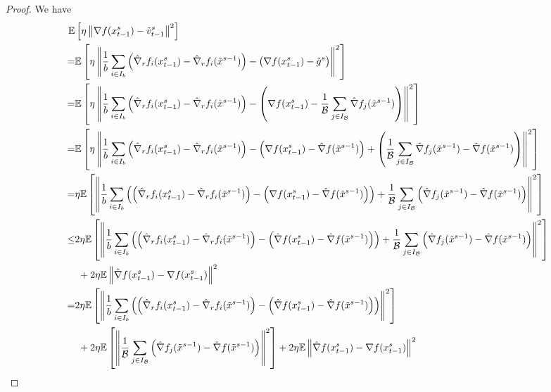 \documentclass[iicol,sn-basic]{sn-jnl}
\theoremstyle{thmstyleone}%
\theoremstyle{thmstyletwo}%
\theoremstyle{thmstylethree}%
\newcommand*{\E}{\mathbb{E}}
\newcommand{\norm}[1]{\left\lVert#1\right\rVert}
\begin{document}
\begin{proof}
We have
\begin{align}
  \E&\left[\eta\norm{\nabla f(x_{t-1}^s)-{\tilde{v}_{t-1}^s}}^2\right]\notag\\
   =&\E\left[\eta\norm{\frac{1}{b}\sum_{i\in I_b}\left(\hat{\nabla}_r f_i(x_{t-1}^s)-\hat{\nabla}_r f_i(\tilde{x}^{s-1})\right) - \left(\nabla f(x_{t-1}^s)-\hat{g}^s\right)}^2\right]\notag\\
   =&\E\left[\eta\norm{\frac{1}{b}\sum_{i\in I_b}\left(\hat{\nabla}_r f_i(x_{t-1}^s)-\hat{\nabla}_r f_i(\tilde{x}^{s-1})\right) - \left(\nabla f(x_{t-1}^s)-\frac{1}{\mathcal{B}}\sum_{j\in I_{\mathcal{B}}}\hat{\nabla} f_j(\tilde{x}^{s-1})\right)}^2\right]\notag\\
   =&\notag\E\left[\eta\norm{\frac{1}{b}\sum_{i\in I_b}\left(\hat{\nabla}_r f_i(x_{t-1}^s)-\hat{\nabla}_r f_i(\tilde{x}^{s-1})\right) - \left(\nabla f(x_{t-1}^s) - \hat{\nabla} f(\tilde{x}^{s-1}) \right)+ \left(\frac{1}{\mathcal{B}}\sum_{j\in I_{\mathcal{B}}}\hat{\nabla} f_j(\tilde{x}^{s-1}) - \hat{\nabla} f(\tilde{x}^{s-1})\right)}^2\right]\\
   =&\notag\eta\E\left[\norm{\frac{1}{b}\sum_{i\in I_b}\left(\left(\hat{\nabla}_r f_i(x_{t-1}^s)-\hat{\nabla}_r f_i(\tilde{x}^{s-1})\right) - \left(\nabla f(x_{t-1}^s) - \hat{\nabla} f(\tilde{x}^{s-1}) \right)\right)+ \frac{1}{\mathcal{B}}\sum_{j\in I_{\mathcal{B}}}\left(\hat{\nabla} f_j(\tilde{x}^{s-1}) - \hat{\nabla} f(\tilde{x}^{s-1})\right)}^2\right]\\
   \leq &\notag2\eta\E\left[\norm{\frac{1}{b}\sum_{i\in I_b}\left(\left(\hat{\nabla}_r f_i(x_{t-1}^s)-\hat{\nabla}_r f_i(\tilde{x}^{s-1})\right) - \left(\hat{\nabla} f(x_{t-1}^s) - \hat{\nabla} f(\tilde{x}^{s-1}) \right)\right)+ \frac{1}{\mathcal{B}}\sum_{j\in I_{\mathcal{B}}}\left(\hat{\nabla} f_j(\tilde{x}^{s-1}) - \hat{\nabla} f(\tilde{x}^{s-1})\right)}^2\right]\\
   &\,\, + 2\eta \E \norm{\hat{\nabla} f(x_{t-1}^s)-\nabla f(x_{t-1}^s)}^2\label{RandSGE-var-estimate-lem-1}\\
    = &\notag 2 \eta\E\left[\norm{\frac{1}{b}\sum_{i\in I_b}\left(\left(\hat{\nabla}_r f_i(x_{t-1}^s)-\hat{\nabla}_r f_i(\tilde{x}^{s-1})\right) - \left(\hat{\nabla} f(x_{t-1}^s) - \hat{\nabla} f(\tilde{x}^{s-1}) \right)\right)}^2\right]\\
   &\,\, +2 \eta \E \left[ \norm{\frac{1}{\mathcal{B}}\sum_{j\in I_{\mathcal{B}}}\left(\hat{\nabla} f_j(\tilde{x}^{s-1}) - \hat{\nabla} f(\tilde{x}^{s-1})\right)}^2\right]+ 2\eta \E \norm{\hat{\nabla} f(x_{t-1}^s)-\nabla f(x_{t-1}^s)}^2\label{RandSGE-var-estimate-lem-2}\\

\end{align}
\end{proof}
\end{document}
